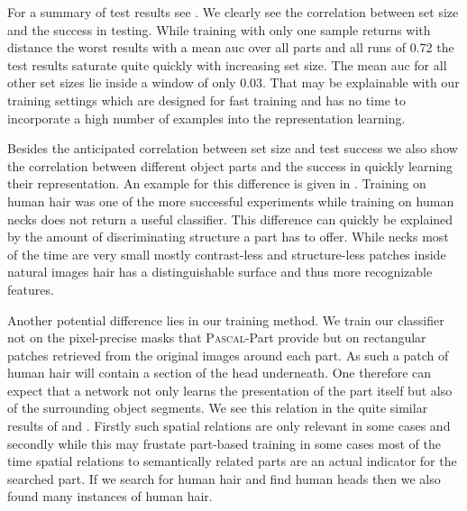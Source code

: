 For a summary of test results see . We clearly see the correlation between set size and the success in testing. While training with only one sample returns with distance the worst results with a mean \gls{auc} over all parts and all runs of 0.72 the test results saturate quite quickly with increasing set size. The mean \gls{auc} for all other set sizes lie inside a window of only 0.03. That may be explainable with our training settings which are designed for fast training and has no time to incorporate a high number of examples into the representation learning.

Besides the anticipated correlation between set size and test success we also show the correlation between different object parts and the success in quickly learning their representation. An example for this difference is given in . Training on human hair was one of the more successful experiments while training on human necks does not return a useful classifier. This difference can quickly be explained by the amount of discriminating structure a part has to offer. While necks most of the time are very small mostly contrast-less and structure-less patches inside natural images hair has a distinguishable surface and thus more recognizable features.

Another potential difference lies in our training method. We train our classifier not on the pixel-precise masks that \textsc{Pascal}-Part provide but on rectangular patches retrieved from the original images around each part. As such a patch of human hair will contain a section of the head underneath. One therefore can expect that a network not only learns the presentation of the part itself but also of the surrounding object segments. We see this relation in the quite similar results of  and . Firstly such spatial relations are only relevant in some cases and secondly while this may frustate part-based training in some cases most of the time spatial relations to semantically related parts are an actual indicator for the searched part. If we search for human hair and find human heads then we also found many instances of human hair.

